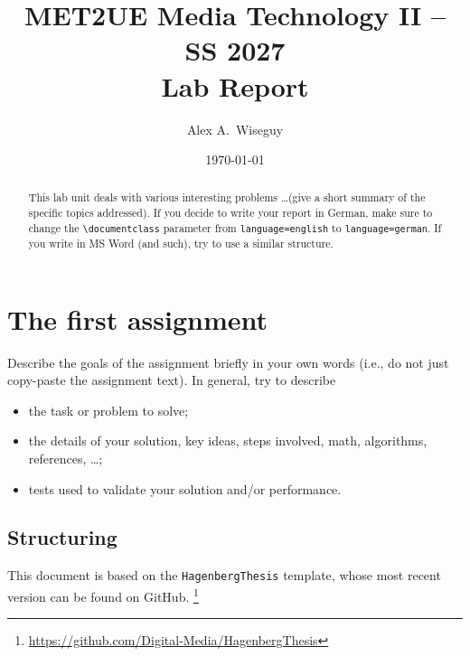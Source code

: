 \documentclass[language=english,titlepage=false,smartquotes=true]{hgbreport}
\begin{document}

\author{Alex A.\ Wiseguy}                      %
\title{MET2UE Media Technology II -- SS 2027\\ %
				Lab Report }
\date{\today}

\maketitle

\begin{abstract}\noindent
This lab unit deals with various interesting problems \ldots (give a short
summary of the specific topics addressed). If you decide to write your report
in German, make sure to change the \verb!\documentclass! parameter from
\texttt{language=english} to \texttt{language=german}. If you write in MS Word (and such), try
to use a similar structure.
\end{abstract}


\section{The first assignment}

Describe the goals of the assignment briefly in your own words (i.e., do not
just copy-paste the assignment text). In general, try to describe
%
\begin{itemize}
	\item the task or problem to solve;
	\item the details of your solution, key ideas, steps involved, math,
	algorithms, references, \ldots;
	\item tests used to validate your solution and/or performance.
\end{itemize}

\subsection{Structuring} %

This \latex document is based on the \texttt{HagenbergThesis} template, whose
most recent version can be found on GitHub.%
\footnote{\url{https://github.com/Digital-Media/HagenbergThesis}}
\end{document}
